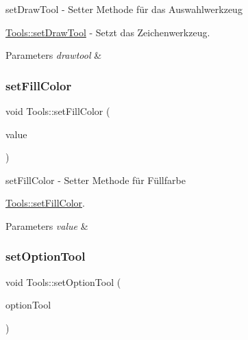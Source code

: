 set\+Draw\+Tool -\/ Setter Methode für das Auswahlwerkzeug 

\hyperlink{class_tools_aa53c7186fb6cd6104ff42014b6f44f93}{Tools\+::set\+Draw\+Tool} -\/ Setzt das Zeichenwerkzeug.


\begin{DoxyParams}{Parameters}
{\em drawtool} & \\
\hline
\end{DoxyParams}
\mbox{\label{class_tools_a4912994771a4424b9aec1a7b16d31176}} 
\subsubsection{\texorpdfstring{set\+Fill\+Color}{setFillColor}}
{\footnotesize\ttfamily void Tools\+::set\+Fill\+Color (\begin{DoxyParamCaption}\item[{const Q\+Color \&}]{value }\end{DoxyParamCaption})\hspace{0.3cm}{\ttfamily [slot]}}



set\+Fill\+Color -\/ Setter Methode für Füllfarbe 

\hyperlink{class_tools_a4912994771a4424b9aec1a7b16d31176}{Tools\+::set\+Fill\+Color}.


\begin{DoxyParams}{Parameters}
{\em value} & \\
\hline
\end{DoxyParams}
\mbox{\label{class_tools_af69d4aa896ef3e1b06ce65e5df53f060}} 
\subsubsection{\texorpdfstring{set\+Option\+Tool}{setOptionTool}}
{\footnotesize\ttfamily void Tools\+::set\+Option\+Tool (\begin{DoxyParamCaption}\item[{const \hyperlink{class_tools_a4b55b2ca4eef4d80ae1042233832bb8b}{Tools\+::\+Option\+Tool}}]{option\+Tool }\end{DoxyParamCaption})\hspace{0.3cm}{\ttfamily [slot]}}



